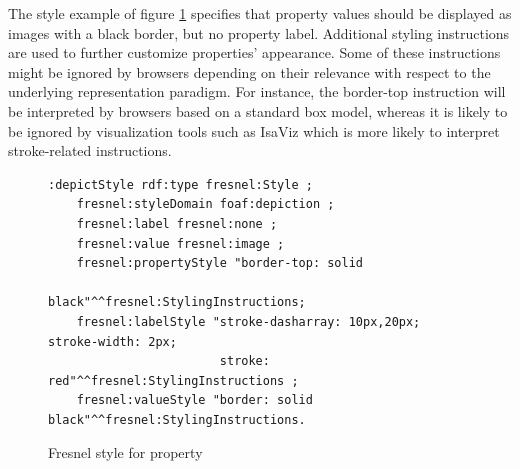 The style example of figure \ref{styleCode} specifies that  property values should be displayed as images with a black border, but no property label. Additional styling instructions are used to further customize  properties' appearance. Some of these instructions might be ignored by browsers depending on their relevance with respect to the underlying representation para\-digm. For instance, the border-top instruction will be interpreted by browsers based on a standard box model, whereas it is likely to be ignored by visualization tools such as IsaViz which is more likely to interpret stroke-related instructions.

\vspace{-0.5cm}

\begin{figure}
\begin{small}
\begin{verbatim}
:depictStyle rdf:type fresnel:Style ;
    fresnel:styleDomain foaf:depiction ;
    fresnel:label fresnel:none ;
    fresnel:value fresnel:image ;
    fresnel:propertyStyle "border-top: solid 
                           black"^^fresnel:StylingInstructions;
    fresnel:labelStyle "stroke-dasharray: 10px,20px; stroke-width: 2px; 
                        stroke: red"^^fresnel:StylingInstructions ;
    fresnel:valueStyle "border: solid black"^^fresnel:StylingInstructions.
\end{verbatim}
\end{small}
\vspace{-0.3cm}
\caption{Fresnel style for property }
\label{styleCode}
\end{figure}


